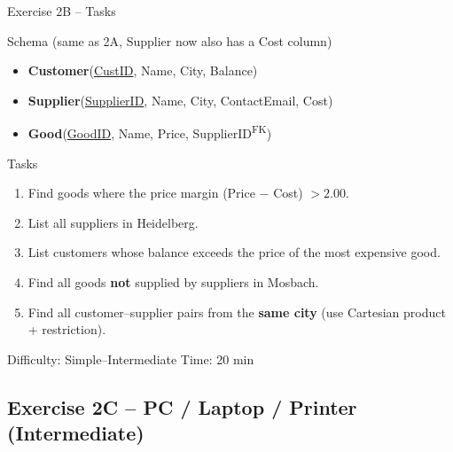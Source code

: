 \documentclass[10pt]{beamer}
\begin{document}
\begin{frame}{Exercise 2B -- Tasks}
  \begin{block}{Schema (same as 2A, Supplier now also has a Cost column)}
    \begin{itemize}
      \item \textbf{Customer}(\underline{CustID}, Name, City, Balance)
      \item \textbf{Supplier}(\underline{SupplierID}, Name, City, ContactEmail, Cost)
      \item \textbf{Good}(\underline{GoodID}, Name, Price, SupplierID\textsuperscript{FK})
    \end{itemize}
  \end{block}

  \begin{block}{Tasks}
    \begin{enumerate}
      \item Find goods where the price margin (Price $-$ Cost) $> 2.00$.
      \item List all suppliers in Heidelberg.
      \item List customers whose balance exceeds the price of the most expensive good.
      \item Find all goods \textbf{not} supplied by suppliers in Mosbach.
      \item Find all customer--supplier pairs from the \textbf{same city} (use Cartesian product + restriction).
    \end{enumerate}
  \end{block}

  \begin{alertblock}{Difficulty: Simple--Intermediate \quad Time: 20 min}
  \end{alertblock}
\end{frame}

\subsection{Exercise 2C -- PC / Laptop / Printer (Intermediate)}
\end{document}

